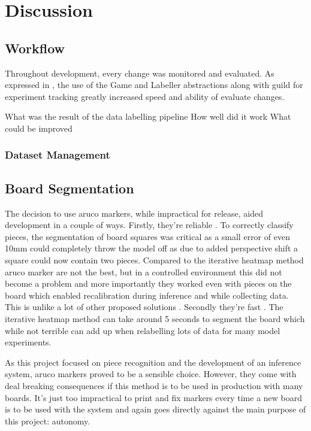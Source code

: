 \chapter{Discussion}
\label{conclusions}

\section{Workflow}
Throughout development, every change was monitored and evaluated.  As expressed in , the use of the Game and Labeller
abstractions along with guild for experiment tracking greatly increased speed and ability of evaluate changes.  

What was the result of the data labelling pipeline
How well did it work
What could be improved

\subsection{Dataset Management}


\section{Board Segmentation}
The decision to use aruco markers, while impractical for release, aided development in a couple of ways.  Firstly, they're reliable \cite{}.
To correctly classify pieces, the segmentation of board squares was critical as a small error of even 10mm could completely throw the
model off as due to added perspective shift a square could now contain two pieces.  Compared to the iterative heatmap method \cite{} aruco 
marker are not the best, but in a controlled environment this did not become a problem and more importantly they worked even with pieces on the
board which enabled recalibration during inference and while collecting data.  This is unlike a lot of other proposed solutions \cite{}.
Secondly they're fast \cite{}.  The iterative heatmap method can take around 5 seconds to segment the board which while not terrible can add up when 
relabelling lots of data for many model experiments.

As this project focused on piece recognition and the development of an inference system, aruco markers proved to be a sensible choice.  However, 
they come with deal breaking consequences if this method is to be used in production with many boards.  It's just too impractical to print and fix
markers every time a new board is to be used with the system and again goes directly against the main purpose of this project: autonomy.


